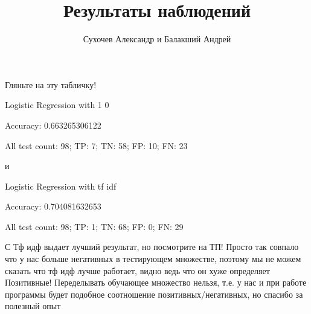 \documentclass[a4paper, 12pt]{article}
\author{Сухочев Александр и Балакший Андрей}
\title{Результаты наблюдений}
\theoremstyle{plain}
\theoremstyle{definition}
\theoremstyle{remark}
\begin{document}
\maketitle

Гляньте на эту табличку!

Logistic Regression with 1 0

Accuracy: 0.663265306122

All test count: 98; TP: 7; TN: 58; FP: 10; FN: 23

и

Logistic Regression with tf idf

Accuracy: 0.704081632653

All test count: 98; TP: 1; TN: 68; FP: 0; FN: 29

С Тф идф выдает лучший результат, но посмотрите на ТП! Просто так совпало что у нас больше негативных в тестирующем множестве, поэтому мы не можем сказать что тф идф лучше работает, видно ведь что он хуже определяет Позитивные! Переделывать обучающее множество нельзя, т.е. у нас и при работе программы будет подобное соотношение позитивных/негативных, но спасибо за полезный опыт
\end{document}
